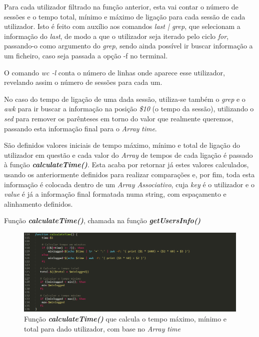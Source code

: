 \documentclass[10pt,portuguese]{article}
\begin{document}
\par Para cada utilizador filtrado na função anterior, esta vai contar o número de sessões e o tempo total, mínimo e máximo de ligação para cada sessão de cada utilizador. Isto é feito com auxílio aos comandos \textit{last  |  grep}, que selecionam a informação do \textit{last}, de modo a que o utilizador seja iterado pelo ciclo \textit{for}, passando-o como argumento do \textit{grep}, sendo ainda possível ir buscar informação a um ficheiro, caso seja passada a opção -f no terminal.
\par O comando \textit{wc -l} conta o número de linhas onde aparece esse utilizador, revelando assim o número de sessões para cada um.
\par No caso do tempo de ligação de uma dada sessão, utiliza-se também o \textit{grep} e o \textit{awk} para ir buscar a informação na posição \textit{\$10} (o tempo da sessão), utilizando o \textit{sed} para remover os parênteses em torno do valor que realmente queremos, passando esta informação final para o \textit{Array} \textit{time}.
\par São definidos valores iniciais de tempo máximo, mínimo e total de ligação do utilizador em questão e cada valor do \textit{Array} de tempos de cada ligação é passado à função \textbf{\textit{calculateTime()}}. Esta acaba por retornar já estes valores calculados, usando os anteriormente definidos para realizar comparações e, por fim, toda esta informação é colocada dentro de um \textit{Array Associativo}, cuja \textit{key} é o utilizador e o \textit{value} é já a informação final formatada numa string, com espaçamento e alinhamento definidos.
\newpage
\par Função \textbf{\textit{calculateTime()}}, chamada na função \textbf{\textit{getUsersInfo()}} 
\begin{figure}[!h]
    \centering
    \includegraphics[width=\textwidth]{calculateTime.png}
    \caption{Função \textbf{\textit{calculateTime()}} que calcula o tempo máximo, mínimo e total para dado utilizador, com base no \textit{Array} \textit{time}}
\end{figure}
\end{document}
